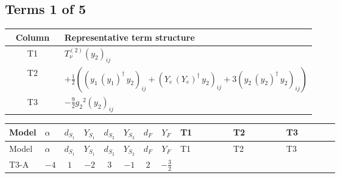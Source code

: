 \documentclass[8pt]{article}
\begin{document}
\begin{landscape}
\subsection*{Terms 1 of 5}
\begin{center}
\begin{tabular}{@{}c >{\raggedright\arraybackslash}p{0.82\linewidth}@{}}
\toprule
Column & Representative term structure \\
\midrule
T1 & \(\displaystyle T_{\nu}^{(2)} \left({y_2}\right)_{ij}\) \\
\midrule
T2 & \(\displaystyle +\frac{1}{2} (\left({y_1}\,\left({y_1}\right)^{\dagger}\,{y_2}\right)_{ij}+\left({Y_e}\,\left({Y_e}\right)^{\dagger}\,{y_2}\right)_{ij}+3 \left({y_2}\,\left({y_2}\right)^{\dagger}\,{y_2}\right)_{ij})\) \\
\midrule
T3 & \(\displaystyle -\frac{9}{2} {g_2}^2 \left({y_2}\right)_{ij}\) \\
\midrule
\bottomrule
\end{tabular}
\end{center}
\smallskip
\tiny
\begin{longtable}{@{}llcccccc >{\raggedright\arraybackslash}p{0.21\linewidth} >{\raggedright\arraybackslash}p{0.21\linewidth} >{\raggedright\arraybackslash}p{0.21\linewidth}@{}}
\toprule
Model & $\alpha$ & $d_{S_1}$ & $Y_{S_1}$ & $d_{S_2}$ & $Y_{S_2}$ & $d_F$ & $Y_F$ & T1 & T2 & T3 \\
\midrule
\endfirsthead
\toprule
Model & $\alpha$ & $d_{S_1}$ & $Y_{S_1}$ & $d_{S_2}$ & $Y_{S_2}$ & $d_F$ & $Y_F$ & T1 & T2 & T3 \\
\midrule
\endhead
T3-A & $-4$ & $1$ & $-2$ & $3$ & $-1$ & $2$ & $-\frac{3}{2}$ & \scriptsize\adjustbox{max width=\linewidth}{$\begin{gathered} T_{\nu}^{(2)} \left({y_2}\right)_{ij}\end{gathered}$} & \scriptsize\adjustbox{max width=\linewidth}{$\begin{gathered} +\frac{1}{2} (\left({y_1}\,\left({y_1}\right)^{\dagger}\,{y_2}\right)_{ij}+\left({Y_e}\,\left({Y_e}\right)^{\dagger}\,{y_2}\right)_{ij}+3 \left({y_2}\,\left({y_2}\right)^{\dagger}\,{y_2}\right)_{ij})\end{gathered}$} & \scriptsize\adjustbox{max width=\linewidth}{$\begin{gathered} -\frac{9}{2} {g_2}^2 \left({y_2}\right)_{ij}\end{gathered}$} \\
\midrule

\end{longtable}
\end{landscape}
\end{document}
